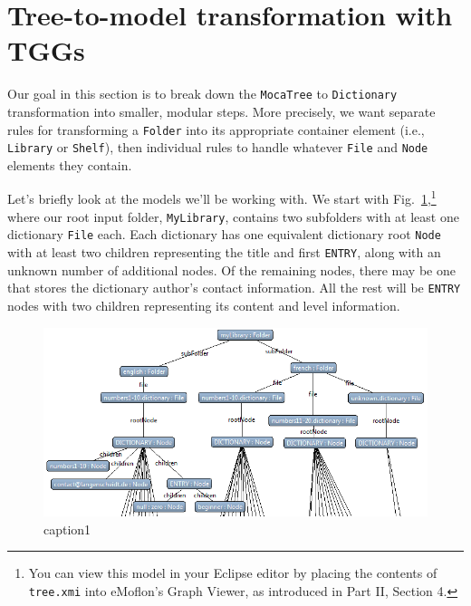 \newpage
\section{Tree-to-model transformation with TGGs}
\genHeader

Our goal in this section is to break down the \texttt{MocaTree} to \texttt{Dictionary} transformation into smaller, modular steps. More precisely, we
want separate rules for transforming a \texttt{Folder} into its appropriate container element (i.e., \texttt{Library} or \texttt{Shelf}), then individual rules
to handle whatever \texttt{File} and \texttt{Node} elements they contain.

\vspace{0.5cm}

Let's briefly look at the models we'll be working with. We start with Fig.~\ref{eclipse:treeStart},\footnote{You can view this model in your Eclipse editor by
placing the contents of \texttt{tree.xmi} into eMoflon's Graph Viewer, as introduced in Part II, Section 4.} where our root input folder, \texttt{MyLibrary},
contains two subfolders with at least one dictionary \texttt{File} each. Each dictionary has one equivalent dictionary root \texttt{Node} with at least two
children representing the title and first \texttt{ENTRY}, along with an unknown number of additional nodes. Of the remaining nodes, there may be one that stores
the dictionary author's contact information. All the rest will be \texttt{ENTRY} nodes with two children representing its content and level information.

\vspace{1cm}

\begin{figure}[htbp]
\hspace{-1.5cm}
 	\includegraphics[width=1.2\textwidth]{eclipse_TreeStartMetamodel}
 	\caption{caption1}
 	\label{eclipse:treeStart}
\end{figure}

